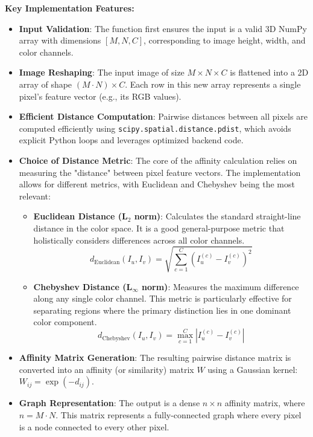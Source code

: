 \documentclass[12pt,a4paper]{article}
\begin{document}
\textbf{Key Implementation Features:}
\begin{itemize}
    \item \textbf{Input Validation}: The function first ensures the input is a valid 3D NumPy array with dimensions $[M, N, C]$, corresponding to image height, width, and color channels.

    \item \textbf{Image Reshaping}: The input image of size $M \times N \times C$ is flattened into a 2D array of shape $(M \cdot N) \times C$. Each row in this new array represents a single pixel's feature vector (e.g., its RGB values).
    \item \textbf{Efficient Distance Computation}: Pairwise distances between all pixels are computed efficiently using \texttt{scipy.spatial.distance.pdist}, which avoids explicit Python loops and leverages optimized backend code.

    \item \textbf{Choice of Distance Metric}: The core of the affinity calculation relies on measuring the "distance" between pixel feature vectors. The implementation allows for different metrics, with Euclidean and Chebyshev being the most relevant:
    \begin{itemize}
        \item \textbf{Euclidean Distance (L$_2$ norm)}: Calculates the standard straight-line distance in the color space. It is a good general-purpose metric that holistically considers differences across all color channels.
        \begin{equation}
        d_{\text{Euclidean}}(I_u, I_v) = \sqrt{\sum_{c=1}^{C} (I_u^{(c)} - I_v^{(c)})^2}
        \end{equation}
        \item \textbf{Chebyshev Distance (L$_\infty$ norm)}: Measures the maximum difference along any single color channel. This metric is particularly effective for separating regions where the primary distinction lies in one dominant color component.
        \begin{equation}
        d_{\text{Chebyshev}}(I_u, I_v) = \max_{c=1}^{C} |I_u^{(c)} - I_v^{(c)}|
        \end{equation}
    \end{itemize}

    \item \textbf{Affinity Matrix Generation}: The resulting pairwise distance matrix is converted into an affinity (or similarity) matrix $W$ using a Gaussian kernel: $W_{ij} = \exp(-d_{ij})$. 
    \item \textbf{Graph Representation}: The output is a dense $n \times n$ affinity matrix, where $n = M \cdot N$. This matrix represents a fully-connected graph where every pixel is a node connected to every other pixel.
\end{itemize}
\end{document}

